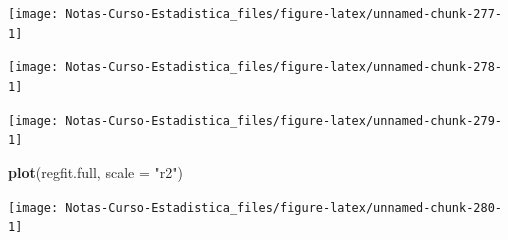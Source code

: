 \documentclass[
  12pt,
]{book}
\newenvironment{Shaded}{\begin{snugshade}}{\end{snugshade}}
\newcommand{\DataTypeTok}[1]{\textcolor[rgb]{0.13,0.29,0.53}{#1}}
\newcommand{\DecValTok}[1]{\textcolor[rgb]{0.00,0.00,0.81}{#1}}
\newcommand{\KeywordTok}[1]{\textcolor[rgb]{0.13,0.29,0.53}{\textbf{#1}}}
\newcommand{\NormalTok}[1]{#1}
\newcommand{\OperatorTok}[1]{\textcolor[rgb]{0.81,0.36,0.00}{\textbf{#1}}}
\newcommand{\StringTok}[1]{\textcolor[rgb]{0.31,0.60,0.02}{#1}}
\theoremstyle{definition}
\theoremstyle{definition}
\theoremstyle{definition}
\theoremstyle{remark}
\begin{document}
\begin{center}\texttt{[image: Notas-Curso-Estadistica\_files/figure-latex/unnamed-chunk-277-1]} \end{center}

\begin{Shaded}
\end{Shaded}

\begin{center}\texttt{[image: Notas-Curso-Estadistica\_files/figure-latex/unnamed-chunk-278-1]} \end{center}

\begin{Shaded}
\end{Shaded}

\begin{center}\texttt{[image: Notas-Curso-Estadistica\_files/figure-latex/unnamed-chunk-279-1]} \end{center}

\begin{Shaded}
\begin{Highlighting}[]
\KeywordTok{plot}\NormalTok{(regfit.full, }\DataTypeTok{scale =} \StringTok{"r2"}\NormalTok{)}
\end{Highlighting}
\end{Shaded}

\begin{center}\texttt{[image: Notas-Curso-Estadistica\_files/figure-latex/unnamed-chunk-280-1]} \end{center}
\end{document}
